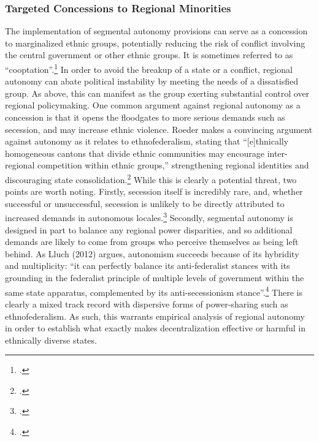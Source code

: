 \documentclass[12pt]{article}
\begin{document}
\subsubsection{Targeted Concessions to Regional Minorities}
The implementation of segmental autonomy provisions can serve as a concession to marginalized ethnic groups, potentially reducing the risk of conflict involving the central government or other ethnic groups. It is sometimes referred to as ``cooptation''.\footcite{seely_political_2001} In order to avoid the breakup of a state or a conflict, regional autonomy can abate political instability by meeting the needs of a dissatisfied group. As above, this can manifest as the group exerting substantial control over regional policymaking. One common argument against regional autonomy as a concession is that it opens the floodgates to more serious demands such as secession, and may increase ethnic violence. Roeder makes a convincing argument against autonomy as it relates to ethnofederalism, stating that ``[e]thnically homogeneous cantons that divide ethnic communities may encourage inter-regional competition within ethnic groups,'' strengthening regional identities and discouraging state consolidation.\footcite[219]{roeder_ethnofederalism_2009} While this is clearly a potential threat, two points are worth noting. Firstly, secession itself is incredibly rare, and, whether successful or unsuccessful, secession is unlikely to be directly attributed to increased demands in autonomous locales.\footcite{mehler_consociationalism_2013, roeder_secessionism_2014} Secondly, segmental autonomy is designed in part to balance any regional power disparities, and so additional demands are likely to come from groups who perceive themselves as being left behind. As Lluch (2012) argues, autonomism succeeds because of its hybridity and multiplicity: ``it can perfectly balance its anti-federalist stances with its grounding in the federalist principle of multiple levels of government within the same state apparatus, complemented by its anti-secessionism stance''.\footcite[155]{lluch_autonomism_2012} There is clearly a mixed track record with dispersive forms of power-sharing such as ethnofederalism. As such, this warrants empirical analysis of regional autonomy in order to establish what exactly makes decentralization effective or harmful in ethnically diverse states. 
\end{document}
